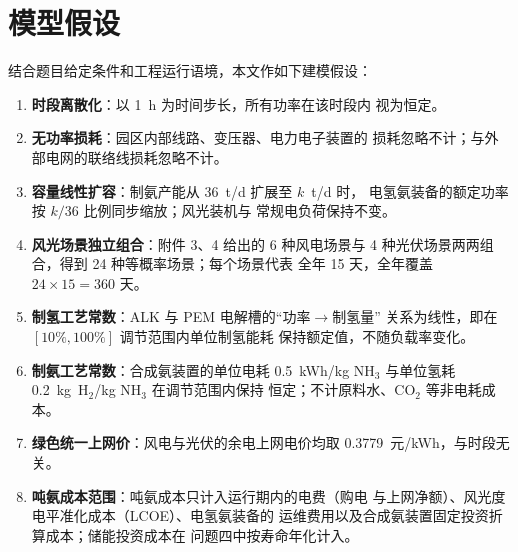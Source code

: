 \section{模型假设}

结合题目给定条件和工程运行语境，本文作如下建模假设：

\begin{enumerate}[label=\textbf{H\arabic*.},leftmargin=3em]
  \item \textbf{时段离散化}：以 1~h 为时间步长，所有功率在该时段内
        视为恒定。
  \item \textbf{无功率损耗}：园区内部线路、变压器、电力电子装置的
        损耗忽略不计；与外部电网的联络线损耗忽略不计。
  \item \textbf{容量线性扩容}：制氨产能从 36~t/d 扩展至 $k$~t/d 时，
        电氢氨装备的额定功率按 $k/36$ 比例同步缩放；风光装机与
        常规电负荷保持不变。
  \item \textbf{风光场景独立组合}：附件 3、4 给出的 6 种风电场景与
        4 种光伏场景两两组合，得到 24 种等概率场景；每个场景代表
        全年 15 天，全年覆盖 $24\times 15 = 360$ 天。
  \item \textbf{制氢工艺常数}：ALK 与 PEM 电解槽的``功率$\to$制氢量''
        关系为线性，即在 $[10\%, 100\%]$ 调节范围内单位制氢能耗
        保持额定值，不随负载率变化。
  \item \textbf{制氨工艺常数}：合成氨装置的单位电耗 0.5~kWh/kg
        NH$_3$ 与单位氢耗 0.2~kg~H$_2$/kg NH$_3$ 在调节范围内保持
        恒定；不计原料水、CO$_2$ 等非电耗成本。
  \item \textbf{绿色统一上网价}：风电与光伏的余电上网电价均取
        0.3779~元/kWh，与时段无关。
  \item \textbf{吨氨成本范围}：吨氨成本只计入运行期内的电费（购电
        与上网净额）、风光度电平准化成本（LCOE）、电氢氨装备的
        运维费用以及合成氨装置固定投资折算成本；储能投资成本在
        问题四中按寿命年化计入。
\end{enumerate}
